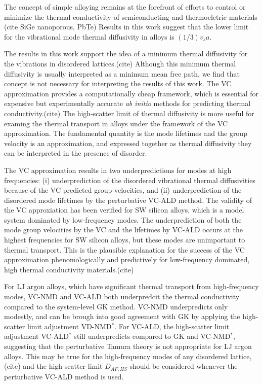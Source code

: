 \documentclass[aps,prb,onecolumn,preprint,superscriptaddress,amsmath,amssymb,floatfix]{revtex4}
\begin{document}
The concept of simple alloying remains at the forefront of efforts  
to control or minimize the thermal conductivity of semiconducting and 
thermoeletric materials (cite SiGe nanoporous, PbTe) 
Results in this work suggest that the lower limit for the vibrational 
mode thermal diffusivity in alloys is $(1/3)v_sa$. 

The results in this work support the idea of a minimum thermal diffusivity 
for the vibrations in disordered lattices.(cite) 
Although this minimum thermal 
diffusivity is usually interpreted as a minimum mean free path, we find 
that concept is not necessary for interpreting the results of this work. 
The VC 
approximation provides a computationally cheap framework, which is 
essential for expensive but experimentally accurate \emph{ab initio} 
methods for predicting thermal conductivity.(cite) 
The high-scatter limit 
of thermal diffusivity is more useful for examing the thermal transport 
in alloys under the framework of the VC approximation. The 
fundamental quantity is the mode lifetimes and the group velocity 
is an approximation, and expressed together as thermal diffusivity 
they can be interpreted in the presence of disorder.

The VC approximation results in two 
underpredictions for modes at high frequencies: 
(i) underprediction of the disordered vibrational 
thermal diffusivities because of the VC predicted group velocities, 
and (ii) underprediction of the disordered mode lifetimes by 
the perturbative VC-ALD method. 
The validity of the VC approxiation has been verified for SW silicon 
alloys, which is a model system dominated by low-frequency modes. 
The underprediction of both the 
mode group velocities by the VC and the lifetimes by VC-ALD 
occurs at the highest 
frequencies for SW silicon alloys, but these modes are unimportant 
to thermal transport. 
This is the plausible explanation for the success of the VC 
approximation phenomologically and predictively for low-frequency 
dominated, high thermal conductivity materials.(cite)

For LJ argon alloys, which have significant thermal transport 
from high-frequency modes, VC-NMD and VC-ALD both underpredcit the 
thermal conductivity compared to the system-level GK method. 
VC-NMD underpredicts only modestly, and can be brough into good 
agreement with GK by applying the high-scatter limit adjustment 
VD-NMD$^*$. For VC-ALD, the high-scatter limit adjustment VC-ALD$^*$ 
still underpredicts compared to GK and VC-NMD$^*$, suggesting that 
the perturbative Tamura theory is not appropriate for LJ argon alloys. 
This may be true for the high-frequency modes of any disordered 
lattice,(cite) and the high-scatter limit $D_{AF,HS}$ should be 
considered whenever the perturbative VC-ALD method is used.
\end{document}
